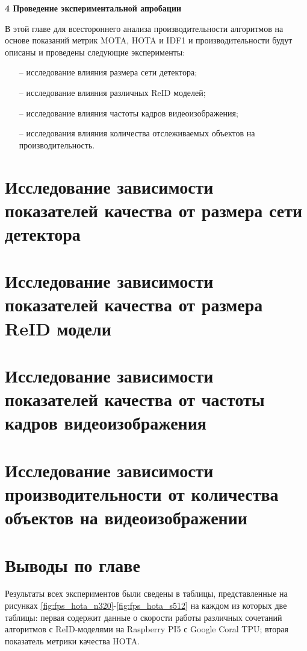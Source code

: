 \newpage
\begin{flushleft}
  \textbf{\large 4 Проведение экспериментальной апробации}
\end{flushleft}
В этой главе для всестороннего анализа производительности алгоритмов на основе показаний метрик MOTA, HOTA и IDF1 и производительности будут описаны и проведены следующие эксперименты:
\begin{itemize}
  \item[--] исследование влияния размера сети детектора;
  \item[--] исследование влияния различных ReID моделей;
  \item[--] исследование влияния частоты кадров видеоизображения;
  \item[--] исследования влияния количества отслеживаемых объектов на производительность.
\end{itemize}


\section{Исследование зависимости показателей качества от размера сети детектора}



\section{Исследование зависимости показателей качества от размера ReID модели}


\section{Исследование зависимости показателей качества от частоты кадров видеоизображения}


\section{Исследование зависимости производительности от количества объектов на видеоизображении}


\section{Выводы по главе}
Результаты всех экспериментов были сведены в таблицы, представленные на рисунках \ref{fig:fps_hota_n320}-\ref{fig:fps_hota_s512} на каждом из которых две таблицы: первая содержит данные о скорости работы различных сочетаний алгоритмов с ReID-моделями на Raspberry PI5 с Google Coral TPU; вторая показатель метрики качества HOTA. 

